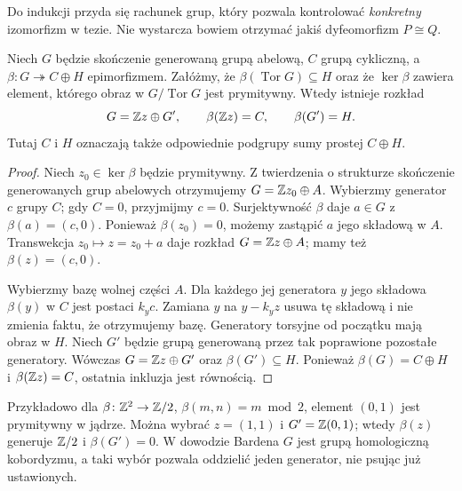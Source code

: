 Do indukcji przyda się rachunek grup,
który pozwala kontrolować
\emph{konkretny} izomorfizm w tezie. Nie
wystarcza bowiem otrzymać jakiś
dyfeomorfizm $P\cong Q$.

\begin{lemat}
\label{lem:barden-generator-24}
Niech $G$ będzie skończenie generowaną grupą
abelową, $C$ grupą cykliczną, a
$\beta\colon G\twoheadrightarrow C\oplus H$
epimorfizmem. Załóżmy, że
$\beta(\operatorname{Tor}G)\subseteq H$
oraz że $\ker\beta$ zawiera element,
którego obraz w $G/\operatorname{Tor}G$
jest prymitywny.
Wtedy istnieje rozkład
\[
G=\mathbb{Z} z\oplus G',\qquad
\beta(\mathbb{Z} z)=C,\qquad \beta(G')=H.
\]
Tutaj $C$ i $H$ oznaczają także odpowiednie
podgrupy sumy prostej $C\oplus H$.
\end{lemat}
\begin{proof}
Niech $z_0\in\ker\beta$ będzie prymitywny.
Z twierdzenia o strukturze skończenie
generowanych grup abelowych otrzymujemy
$G=\mathbb{Z} z_0\oplus A$. Wybierzmy generator
$c$ grupy $C$; gdy $C=0$, przyjmijmy $c=0$.
Surjektywność $\beta$ daje $a\in G$ z
$\beta(a)=(c,0)$. Ponieważ
$\beta(z_0)=0$, możemy zastąpić $a$ jego
składową w $A$. Transwekcja
$z_0\mapsto z=z_0+a$ daje rozkład
$G=\mathbb{Z} z\oplus A$; mamy też
$\beta(z)=(c,0)$.

Wybierzmy bazę wolnej części $A$.
Dla każdego jej generatora
$y$ jego składowa $\beta(y)$ w $C$ jest
postaci $k_yc$. Zamiana $y$ na
$y-k_yz$ usuwa tę składową i nie zmienia
faktu, że otrzymujemy bazę. Generatory
torsyjne od początku mają obraz w $H$.
Niech $G'$ będzie grupą generowaną przez
tak poprawione pozostałe generatory.
Wówczas $G=\mathbb{Z} z\oplus G'$ oraz
$\beta(G')\subseteq H$. Ponieważ
$\beta(G)=C\oplus H$ i $\beta(\mathbb{Z} z)=C$,
ostatnia inkluzja jest równością.
\end{proof}

Przykładowo dla
$\beta\colon\mathbb{Z}^2\to\mathbb{Z}/2$,
$\beta(m,n)=m\bmod 2$, element $(0,1)$
jest prymitywny w jądrze. Można wybrać
$z=(1,1)$ i $G'=\mathbb{Z}(0,1)$; wtedy
$\beta(z)$ generuje $\mathbb{Z}/2$ i
$\beta(G')=0$. W dowodzie Bardena $G$
jest grupą homologiczną kobordyzmu,
a taki wybór pozwala oddzielić jeden
generator, nie psując już ustawionych.

